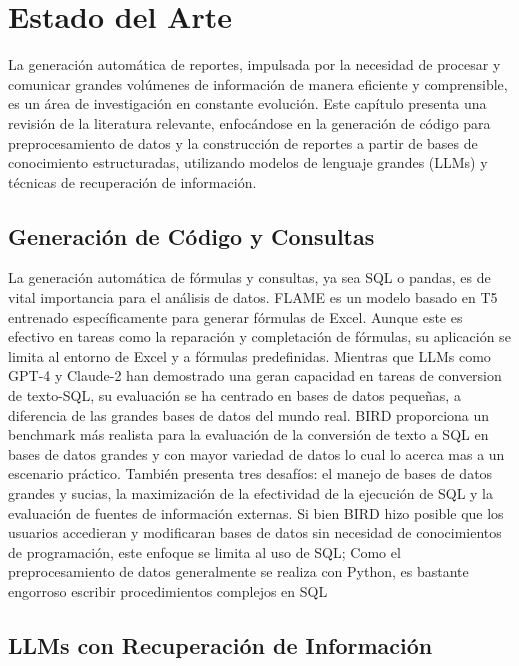 \chapter{Estado del Arte}\label{chapter:state-of-the-art}

La generación automática de reportes, impulsada por la necesidad de procesar y comunicar grandes volúmenes de información de manera eficiente y comprensible, es un área de investigación en constante evolución. Este capítulo presenta una revisión de la literatura relevante, enfocándose en la generación de código para preprocesamiento de datos y la construcción de reportes a partir de bases de conocimiento estructuradas, utilizando modelos de lenguaje grandes (LLMs) y técnicas de recuperación de información.

\section{Generación de Código y Consultas}

La generación automática de fórmulas y consultas, ya sea SQL o pandas, es de vital importancia para el análisis de datos.  FLAME \cite{flame} es un modelo basado en T5 entrenado específicamente para generar fórmulas de Excel. Aunque este es efectivo en tareas como la reparación y completación de fórmulas, su aplicación se limita al entorno de Excel y a fórmulas predefinidas. Mientras que LLMs como GPT-4 y Claude-2 han demostrado una geran capacidad en tareas de conversion de texto-SQL, su evaluación se ha centrado en bases de datos pequeñas, a diferencia de las grandes bases de datos del mundo real.
BIRD \cite{bird} proporciona un benchmark más realista para la evaluación de la conversión de texto a SQL en bases de datos grandes y con mayor variedad de datos lo cual lo acerca mas a un escenario práctico. También presenta tres desafíos: el manejo de bases de datos grandes y sucias, la maximización de la efectividad de la ejecución de SQL y la evaluación de fuentes de información externas. Si bien BIRD hizo posible que los usuarios accedieran y modificaran bases de datos sin necesidad de conocimientos de programación, este enfoque se limita al uso de SQL; Como el preprocesamiento de datos generalmente se realiza con Python, es bastante engorroso  escribir procedimientos complejos en SQL

\section{LLMs con Recuperación de Información}

